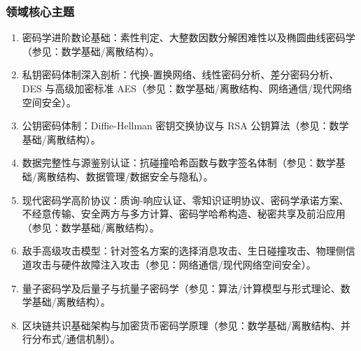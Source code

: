 \subsubsection{领域核心主题}
\begin{enumerate}\setlength{\itemsep}{0pt}\setlength{\parskip}{0pt}\setcounter{enumi}{7}
    \item 密码学进阶数论基础：素性判定、大整数因数分解困难性以及椭圆曲线密码学（参见：数学基础/离散结构）。
    \item 私钥密码体制深入剖析：代换-置换网络、线性密码分析、差分密码分析、DES 与高级加密标准 AES（参见：数学基础/离散结构、网络通信/现代网络空间安全）。
    \item 公钥密码体制：Diffie-Hellman 密钥交换协议与 RSA 公钥算法（参见：数学基础/离散结构）。
    \item 数据完整性与源鉴别认证：抗碰撞哈希函数与数字签名体制（参见：数学基础/离散结构、数据管理/数据安全与隐私）。
    \item 现代密码学高阶协议：质询-响应认证、零知识证明协议、密码学承诺方案、不经意传输、安全两方与多方计算、密码学哈希构造、秘密共享及前沿应用（参见：数学基础/离散结构）。
    \item 敌手高级攻击模型：针对签名方案的选择消息攻击、生日碰撞攻击、物理侧信道攻击与硬件故障注入攻击（参见：网络通信/现代网络空间安全）。
    \item 量子密码学及后量子与抗量子密码学（参见：算法/计算模型与形式理论、数学基础/离散结构）。
    \item 区块链共识基础架构与加密货币密码学原理（参见：数学基础/离散结构、并行分布式/通信机制）。
\end{enumerate}

